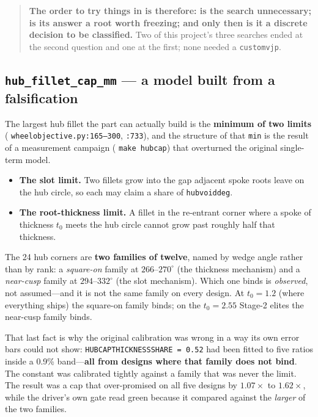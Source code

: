 \documentclass[11pt,a4paper]{article}
\DeclareRobustCommand{\code}[1]{%
  \texttt{\small\def\_{\textunderscore\discretionary{}{}{}}#1}}
\newcommand{\at}[2]{\code{#1:#2}}
\begin{document}
\begin{quote}
\textbf{The order to try things in is therefore: is the search unnecessary; is its
answer a root worth freezing; and only then is it a discrete decision to be
classified.} Two of this project's three searches ended at the second question and one
at the first; none needed a \code{custom\_vjp}.
\end{quote}

\subsection{\texttt{hub\_fillet\_cap\_mm} --- a model built from a falsification}
\label{sec:hubcap}

The largest hub fillet the part can actually build is the \textbf{minimum of two
limits} (\at{wheel\_objective.py}{165--300}, \code{:733}), and the structure of that
\code{min} is the result of a measurement campaign (\code{make hubcap}) that overturned
the original single-term model.

\begin{itemize}
\item \textbf{The slot limit.} Two fillets grow into the gap adjacent spoke roots leave
  on the hub circle, so each may claim a share of \code{hub\_void\_deg}.
\item \textbf{The root-thickness limit.} A fillet in the re-entrant corner where a spoke
  of thickness $t_0$ meets the hub circle cannot grow past roughly half that thickness.
\end{itemize}

The 24 hub corners are \textbf{two families of twelve}, named by wedge angle rather than
by rank: a \emph{square-on} family at $266$--$270^\circ$ (the thickness mechanism) and a
\emph{near-cusp} family at $294$--$332^\circ$ (the slot mechanism). Which one binds is
\emph{observed}, not assumed---and it is not the same family on every design. At
$t_0 = 1.2$ (where everything ships) the square-on family binds; on the $t_0 = 2.55$
Stage-2 elites the near-cusp family binds.

That last fact is why the original calibration was wrong in a way its own error bars
could not show: \code{HUB\_CAP\_THICKNESS\_SHARE = 0.52} had been fitted to five ratios
inside a 0.9\% band---\textbf{all from designs where that family does not bind}. The
constant was calibrated tightly against a family that was never the limit. The result
was a cap that over-promised on all five designs by $1.07\times$ to $1.62\times$, while
the driver's own gate read green because it compared against the \emph{larger} of the
two families.
\end{document}
